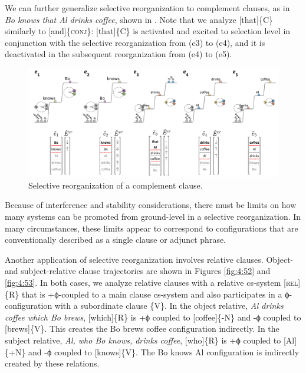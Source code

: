   We can further generalize selective reorganization to complement clauses, as in \textit{Bo knows that Al drinks coffee}, shown in {}. Note that we analyze [that]\{C\} similarly to [and]\{\textsc{conj}\}: [that]\{C\} is activated and excited to selection level in conjunction with the selective reorganization from (e3) to (e4), and it is deactivated in the subsequent reorganization from (e4) to (e5). 

  
\begin{figure}
\includegraphics[width=\textwidth]{figures/Tilsen-img101.png}
\caption{Selective reorganization of a complement clause.}
\label{fig:4:51}
\end{figure}
 

  Because of interference and stability considerations, there must be limits on how many systems can be promoted from ground-level in a selective reorganization. In many circumstances, these limits appear to correspond to configurations that are conventionally described as a single clause or adjunct phrase.

  Another application of selective reorganization involves relative clauses. Object- and subject-relative clause trajectories are shown in Figures {\ref{fig:4:52}} and {\ref{fig:4:53}}. In both cases, we analyze relative clauses with a relative cs-system [\textsc{rel}]\{R\} that is +ϕ-coupled to a main clause cs-system and also participates in a ϕ-configuration with a subordinate clause \{V\}. In the object relative, \textit{Al drinks coffee which Bo brews}, [which]\{R\} is +ϕ coupled to [coffee]\{-N\} and -ϕ coupled to [brews]\{V\}. This creates the {\textbar}Bo brews coffee{\textbar} configuration indirectly. In the subject relative, \textit{Al, who Bo knows, drinks coffee}, [who]\{R\} is +ϕ coupled to [Al]\{+N\} and -ϕ coupled to [knows]\{V\}. The {\textbar}Bo knows Al{\textbar} configuration is indirectly created by these relations.

